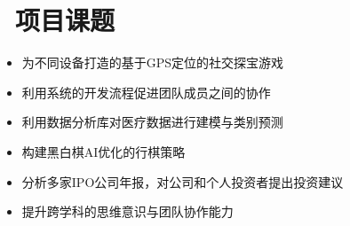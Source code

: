 \documentclass{resume}
\begin{document}



\section{\faBook\ 项目课题}

\begin{itemize}
  \item 为不同设备打造的基于GPS定位的社交探宝游戏
  \item 利用系统的开发流程促进团队成员之间的协作
\end{itemize}

\begin{itemize}
  \item 利用数据分析库对医疗数据进行建模与类别预测
  \item 构建黑白棋AI优化的行棋策略
\end{itemize}

\begin{itemize}
  \item 分析多家IPO公司年报，对公司和个人投资者提出投资建议
  \item 提升跨学科的思维意识与团队协作能力
\end{itemize}
\end{document}
